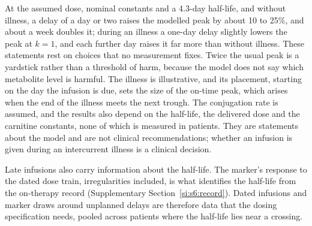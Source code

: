 At the assumed dose, nominal constants and a 4.3-day half-life, and without illness, a delay of a day
or two raises the modelled peak by about 10 to 25\%, and about a week doubles it; during an illness a
one-day delay slightly lowers the peak at $k=1$, and each further day raises it far more than without
illness. These statements rest on choices that no measurement fixes. Twice the usual peak is a
yardstick rather than a threshold of harm, because the model does not say which metabolite level is
harmful. The illness is illustrative, and its placement, starting on the day the infusion is due,
sets the size of the on-time peak, which arises when the end of the illness meets the next trough.
The conjugation rate is assumed, and the results also depend on the half-life, the delivered dose and
the carnitine constants, none of which is measured in patients. They are statements about the model
and are not clinical recommendations; whether an infusion is given during an intercurrent illness is
a clinical decision.

Late infusions also carry information about the half-life. The marker's response to the dated dose
train, irregularities included, is what identifies the half-life from the on-therapy record
(Supplementary Section~\ref{si:s6:record}). Dated infusions and marker draws around unplanned delays
are therefore data that the dosing specification needs, pooled across patients where the half-life
lies near a crossing.
